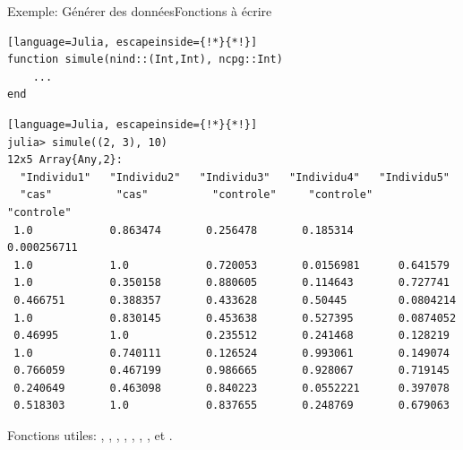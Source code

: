 \begin{frame}[containsverbatim]{\textcolor{goldenrod2}{Exemple:} Générer des données}{Fonctions à écrire}
    \begin{description}
    \end{description}
\begin{lstlisting}[language=Julia, escapeinside={!*}{*!}]
function simule(nind::(Int,Int), ncpg::Int)
    ...
end
\end{lstlisting}
\vspace{-2ex}
\begin{lstlisting}[language=Julia, escapeinside={!*}{*!}]
julia> simule((2, 3), 10)
12x5 Array{Any,2}:
  "Individu1"   "Individu2"   "Individu3"   "Individu4"   "Individu5"
  "cas"          "cas"          "controle"     "controle"     "controle"
 1.0            0.863474       0.256478       0.185314       0.000256711
 1.0            1.0            0.720053       0.0156981      0.641579
 1.0            0.350158       0.880605       0.114643       0.727741
 0.466751       0.388357       0.433628       0.50445        0.0804214
 1.0            0.830145       0.453638       0.527395       0.0874052
 0.46995        1.0            0.235512       0.241468       0.128219
 1.0            0.740111       0.126524       0.993061       0.149074
 0.766059       0.467199       0.986665       0.928067       0.719145
 0.240649       0.463098       0.840223       0.0552221      0.397078
 0.518303       1.0            0.837655       0.248769       0.679063

\end{lstlisting}
    \par{Fonctions utiles: , , , , , , , \cmdb{\textquotesingle} et .}
\end{frame}


